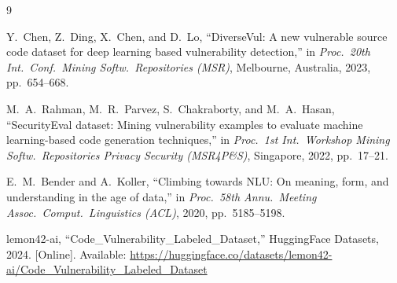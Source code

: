 \documentclass[11pt,a4paper]{article}
\begin{document}
\begin{thebibliography}{9}

Y.~Chen, Z.~Ding, X.~Chen, and D.~Lo, ``DiverseVul: A new vulnerable source code dataset for deep learning based vulnerability detection,'' in \textit{Proc.\ 20th Int.\ Conf.\ Mining Softw.\ Repositories (MSR)}, Melbourne, Australia, 2023, pp.~654--668.

M.~A.~Rahman, M.~R.~Parvez, S.~Chakraborty, and M.~A.~Hasan, ``SecurityEval dataset: Mining vulnerability examples to evaluate machine learning-based code generation techniques,'' in \textit{Proc.\ 1st Int.\ Workshop Mining Softw.\ Repositories Privacy Security (MSR4P\&S)}, Singapore, 2022, pp.~17--21.

E.~M.~Bender and A.~Koller, ``Climbing towards NLU: On meaning, form, and understanding in the age of data,'' in \textit{Proc.\ 58th Annu.\ Meeting Assoc.\ Comput.\ Linguistics (ACL)}, 2020, pp.~5185--5198.

lemon42-ai, ``Code\_Vulnerability\_Labeled\_Dataset,'' HuggingFace Datasets, 2024. [Online]. Available: \url{https://huggingface.co/datasets/lemon42-ai/Code_Vulnerability_Labeled_Dataset}

\end{thebibliography}
\end{document}

